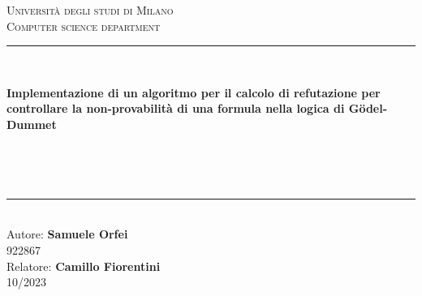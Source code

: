 \documentclass[\main/tesi.tex]{subfiles}
\begin{document}
\pagestyle{empty}
\begin{titlepage}
    \begin{center}
        \vfill
        {\large \scshape Università degli studi di Milano}\\[0.1cm]
        {\large \scshape Computer science department}\\[0.5cm]
        \rule{\textwidth}{1.5pt}\\[0cm]
        {\huge \bfseries  Implementazione di un algoritmo per il calcolo di refutazione per controllare la non-provabilità di una formula nella logica di G\"odel-Dummet \par \ }\\[-0.5cm]
        \rule{\textwidth}{1.5pt}\\[2.5cm]
        {\hfill \large Autore: \textbf{Samuele Orfei}} \\
        \vspace{0.1cm}
        {\hfill \large 922867} \\
        \vspace{0.5cm}
        {\hfill \large Relatore: \textbf{Camillo Fiorentini}} \\
        \vspace{1cm}
        \hfill  10/2023
    \end{center}
\end{titlepage}
\end{document}
